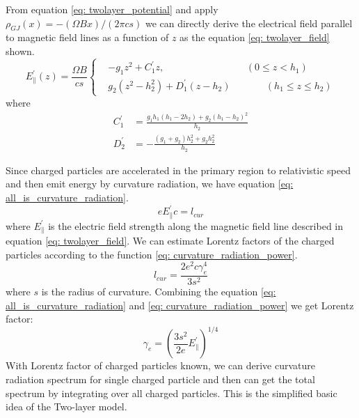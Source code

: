 \documentclass[12pt]{report}
\begin{document}
      From equation \ref{eq: twolayer_potential} and apply $\rho_{GJ}\left(x\right)=-\left(\Omega B x\right)/\left(2\pi cs\right)$ 
      we can directly derive the electrical field parallel to magnetic field lines as a function of $z$
      as the equation \ref{eq: twolayer_field} shown.
      \begin{equation}
        \label{eq: twolayer_field}
          E^{\prime}_{\parallel}\left(z\right) = \frac{\Omega B}{cs}
          \left\{\begin{alignedat}{2}
             & -g_1 z^2 + C_1^{\prime}z ,  &&\left(0 \leq z < h_{1}\right)\\
             & g_2\left(z^2 - h_2^2\right) + D_1^{\prime}\left(z-h_2\right)  &&\qquad \left(h_{1} \leq z \leq h_{2}\right) 
          \end{alignedat}\right.
      \end{equation}
      where 
      \begin{align*}
        C_{1}^{\prime} &= \frac{g_1 h_1 \left(h_1 - 2h_2\right)+ g_2\left(h_1-h_2\right)^2}{h_2} \\
        D_{2}^{\prime} &= -\frac{\left(g_1 + g_2\right)h_2^2 + g_2 h_2^2}{h_2}
      \end{align*}

      Since charged particles are accelerated in the primary region to relativistic speed 
      and then emit energy by curvature radiation, we have equation \ref{eq: all_is_curvature_radiation}.
      \begin{equation}
        \label{eq: all_is_curvature_radiation}
        e E_{\parallel}^{\prime} c = l_{cur}
      \end{equation}
      where $E_\parallel^{\prime}$ is the electric field strength along the magnetic field line 
      described in equation \ref{eq: twolayer_field}.
      We can estimate Lorentz factors of the charged particles according to the function 
      \ref{eq: curvature_radiation_power}.
      \begin{equation}
        \label{eq: curvature_radiation_power}
        l_{cur} = \frac{2 e^2 c \gamma^{4}_{e}}{3s^2}
      \end{equation}      
      where $s$ is the radius of curvature. 
      Combining the equation \ref{eq: all_is_curvature_radiation} and 
      \ref{eq: curvature_radiation_power} we get Lorentz factor: 
      \begin{equation}
        \label{eq: gamma_can_be_zero}
        \gamma_{e} = \left(\frac{3s^2}{2e} E_{\parallel}^{\prime}\right)^{1/4}
      \end{equation}
      With Lorentz factor of charged particles known, we can derive curvature radiation spectrum
      for single charged particle and then can get the total spectrum by integrating over all 
      charged particles. This is the simplified basic idea of the Two-layer model. 
\end{document}
